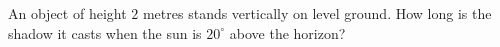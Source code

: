 An object of height $2$ metres stands vertically on level ground. How long is the shadow it casts when the sun is $20^\circ$ above the horizon?

